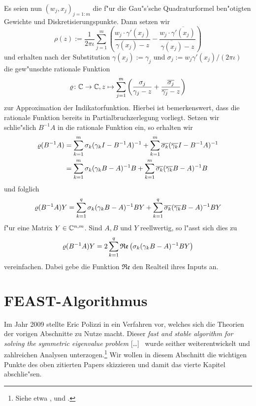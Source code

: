 \newpage

Es seien nun $(w_j, x_j)_{j=1:m}$
die f"ur die Gau"s'sche Quadraturformel ben"otigten Gewichte und Diskretisierungspunkte.
Dann setzen wir
\[
\rho(z) := \frac{1}{2\pi\iota}\sum_{j=1}^m \left(
\frac{w_j \cdot \gamma'(x_j)}{\gamma(x_j)-z} - \frac{w_j \cdot \overline{\gamma'(x_j)}}{\overline{\gamma(x_j)}-z}
\right)
\]
und erhalten nach der Substitution $\gamma(x_j) := \gamma_j$ und
$\sigma_j := w_j \gamma'(x_j) / (2\pi\iota)$ die gew"unschte rationale
Funktion
\[
\varrho\colon\mathbb{C}\to\mathbb{C}, z\mapsto\sum_{j=1}^m\left(\frac{\sigma_j}{\gamma_j - z} +
\frac{\overline{\sigma_j}}{\overline{\gamma_j} - z}\right)
\]
zur Approximation der Indikatorfunktion. Hierbei ist bemerkenswert, dass die
rationale Funktion bereits in Partialbruchzerlegung vorliegt.
Setzen wir schlie"slich $B^{-1}A$ in die
rationale Funktion ein, so erhalten wir
\begin{align*}
\varrho(B^{-1}A) &= \sum_{k=1}^m \sigma_k (\gamma_k I - B^{-1}A)^{-1} +
\sum_{k=1}^m \overline{\sigma_k} (\overline{\gamma_k} I - B^{-1}A)^{-1}\\
&= \sum_{k=1}^m \sigma_k (\gamma_k B - A)^{-1} B +
\sum_{k=1}^m \overline{\sigma_k} (\overline{\gamma_k} B - A)^{-1} B
\end{align*}
und folglich
\[
\varrho(B^{-1}A)Y =
\sum_{k=1}^q \sigma_k (\gamma_k B - A)^{-1} BY +
\sum_{k=1}^q \overline{\sigma_k} (\overline{\gamma_k} B - A)^{-1} BY
\]
f"ur eine Matrix $Y\in\mathbb{C}^{n,m}$. Sind $A, B$ und $Y$ reellwertig, so l"asst sich dies zu
\begin{equation}\label{eq:chap4:realteilsumme}
\varrho(B^{-1}A)Y =
2\sum_{k=1}^q \mathfrak{Re}\left(\sigma_k (\gamma_k B - A)^{-1} BY\right)
\end{equation}
vereinfachen. Dabei gebe die Funktion $\mathfrak{Re}$ den Realteil ihres Inputs an.

\section{FEAST-Algorithmus}

Im Jahr 2009 stellte Eric Polizzi in \cite{polizzi} ein Verfahren vor, welches sich die Theorien der vorigen Abschnitte zu Nutze macht. Dieser \glqq[\ldots] \emph{fast and stable algorithm for solving the symmetric eigenvalue problem} [\ldots]\grqq\ \cite[Abstract]{polizzi} wurde seither weiterentwickelt und zahlreichen Analysen unterzogen.\footnote{Siehe etwa \cite{ptep},\cite{kpt} und \cite{lzp}.}
Wir wollen in diesem Abschnitt die wichtigen Punkte des oben zitierten Papers skizzieren und damit das vierte Kapitel abschlie"sen.

